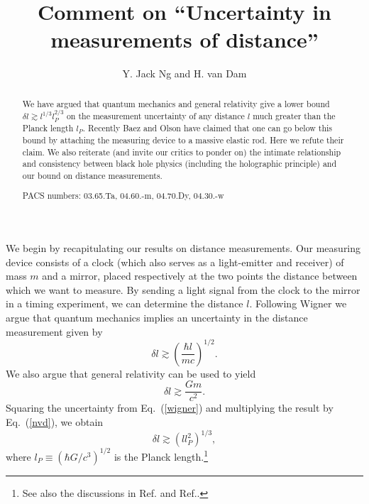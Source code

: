 \documentclass[preprint2]{aastex}
\begin{document}
\title{Comment on ``Uncertainty in measurements of distance''}

\author{Y. Jack Ng and H. van Dam}


\begin{abstract}
We have argued that quantum mechanics and general relativity give a lower
bound $\delta l \gtrsim l^{1/3} l_P^{2/3}$ on the
measurement uncertainty of any distance
$l$ much greater than the Planck length $l_P$.
Recently Baez and Olson have claimed that one can go below this bound by
attaching the measuring device to a massive elastic rod.  Here we refute
their claim.  We also reiterate (and invite our critics to
ponder on) the intimate relationship and
consistency between black hole physics (including the holographic
principle) and our bound on distance measurements.

\bigskip

PACS numbers: 03.65.Ta, 04.60.-m, 04.70.Dy, 04.30.-w

\end{abstract}




We begin by recapitulating our results on distance
measurements. \citep{ngy94,ngy95}  Our
measuring device consists of a clock (which also serves as a light-emitter
and receiver) of mass $m$ and a mirror, placed respectively at the two
points the distance between which we want to measure.  By sending a light
signal from the clock to the mirror in a timing experiment, we can
determine the distance $l$.  Following Wigner\citep{wig57,sal58} we argue
that
quantum mechanics implies an uncertainty in the distance measurement
given by
\begin{equation}
\delta l \gtrsim \left(\frac{\hbar l}{mc}\right)^{1/2}.
\label{wigner}
\end{equation}
We also argue that general relativity can be used to yield
\begin{equation}
\delta l \gtrsim \frac{G m}{c^2}.
\label{nvd}
\end{equation}
Squaring the uncertainty from Eq.~(\ref{wigner}) and multiplying the result
by Eq.~(\ref{nvd}), we obtain\citep{ngy94,ngy95}
\begin{equation}
\delta l \gtrsim (l l_P^2)^{1/3},
\label{deltal}
\end{equation}
where $l_P \equiv (\hbar G/c^3)^{1/2}$ is the Planck length.\footnote{See
also the discussions in Ref.\citep{kar66} and Ref.\citep{sas99}.}
\end{document}
